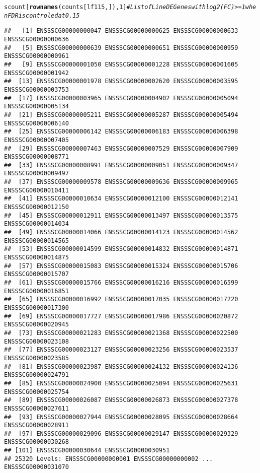 \documentclass{article}\usepackage[]{graphicx}\usepackage[]{color}
\makeatletter
\newcommand{\hlnum}[1]{\textcolor[rgb]{0.686,0.059,0.569}{#1}}%
\newcommand{\hlcom}[1]{\textcolor[rgb]{0.678,0.584,0.686}{\textit{#1}}}%
\newcommand{\hlstd}[1]{\textcolor[rgb]{0.345,0.345,0.345}{#1}}%
\newcommand{\hlkwd}[1]{\textcolor[rgb]{0.737,0.353,0.396}{\textbf{#1}}}%
\newenvironment{kframe}{%
 \def\at@end@of@kframe{}%
 \ifinner\ifhmode%
  \def\at@end@of@kframe{\end{minipage}}%
  \begin{minipage}{\columnwidth}%
 \fi\fi%
 \def\FrameCommand##1{\hskip\@totalleftmargin \hskip-\fboxsep
 \colorbox{shadecolor}{##1}\hskip-\fboxsep
     \hskip-\linewidth \hskip-\@totalleftmargin \hskip\columnwidth}%
 \MakeFramed {\advance\hsize-\width
   \@totalleftmargin\z@ \linewidth\hsize
   \@setminipage}}%
 {\par\unskip\endMakeFramed%
 \at@end@of@kframe}
\newenvironment{knitrout}{}{} %
\makeatother
\begin{document}
\begin{knitrout}
\begin{kframe}
\begin{alltt}
\hlstd{scount[}\hlkwd{rownames}\hlstd{(counts[lf115, ]),} \hlnum{1}\hlstd{]}  \hlcom{# List of  Line DE Genes with log2(FC) >=1 when FDR is controled at 0.15}
\end{alltt}
\begin{verbatim}
##   [1] ENSSSCG00000000047 ENSSSCG00000000625 ENSSSCG00000000633 ENSSSCG00000000636
##   [5] ENSSSCG00000000639 ENSSSCG00000000651 ENSSSCG00000000959 ENSSSCG00000000961
##   [9] ENSSSCG00000001050 ENSSSCG00000001228 ENSSSCG00000001605 ENSSSCG00000001942
##  [13] ENSSSCG00000001978 ENSSSCG00000002620 ENSSSCG00000003595 ENSSSCG00000003753
##  [17] ENSSSCG00000003965 ENSSSCG00000004902 ENSSSCG00000005094 ENSSSCG00000005134
##  [21] ENSSSCG00000005211 ENSSSCG00000005287 ENSSSCG00000005494 ENSSSCG00000006140
##  [25] ENSSSCG00000006142 ENSSSCG00000006183 ENSSSCG00000006398 ENSSSCG00000007405
##  [29] ENSSSCG00000007463 ENSSSCG00000007529 ENSSSCG00000007909 ENSSSCG00000008771
##  [33] ENSSSCG00000008991 ENSSSCG00000009051 ENSSSCG00000009347 ENSSSCG00000009497
##  [37] ENSSSCG00000009578 ENSSSCG00000009636 ENSSSCG00000009965 ENSSSCG00000010411
##  [41] ENSSSCG00000010634 ENSSSCG00000012100 ENSSSCG00000012141 ENSSSCG00000012150
##  [45] ENSSSCG00000012911 ENSSSCG00000013497 ENSSSCG00000013575 ENSSSCG00000014034
##  [49] ENSSSCG00000014066 ENSSSCG00000014123 ENSSSCG00000014562 ENSSSCG00000014565
##  [53] ENSSSCG00000014599 ENSSSCG00000014832 ENSSSCG00000014871 ENSSSCG00000014875
##  [57] ENSSSCG00000015083 ENSSSCG00000015324 ENSSSCG00000015706 ENSSSCG00000015707
##  [61] ENSSSCG00000015766 ENSSSCG00000016216 ENSSSCG00000016599 ENSSSCG00000016851
##  [65] ENSSSCG00000016992 ENSSSCG00000017035 ENSSSCG00000017220 ENSSSCG00000017300
##  [69] ENSSSCG00000017727 ENSSSCG00000017986 ENSSSCG00000020872 ENSSSCG00000020945
##  [73] ENSSSCG00000021283 ENSSSCG00000021368 ENSSSCG00000022500 ENSSSCG00000023108
##  [77] ENSSSCG00000023127 ENSSSCG00000023256 ENSSSCG00000023537 ENSSSCG00000023585
##  [81] ENSSSCG00000023987 ENSSSCG00000024132 ENSSSCG00000024136 ENSSSCG00000024791
##  [85] ENSSSCG00000024900 ENSSSCG00000025094 ENSSSCG00000025631 ENSSSCG00000025754
##  [89] ENSSSCG00000026087 ENSSSCG00000026873 ENSSSCG00000027378 ENSSSCG00000027611
##  [93] ENSSSCG00000027944 ENSSSCG00000028095 ENSSSCG00000028664 ENSSSCG00000028911
##  [97] ENSSSCG00000029096 ENSSSCG00000029147 ENSSSCG00000029329 ENSSSCG00000030268
## [101] ENSSSCG00000030644 ENSSSCG00000030951
## 25320 Levels: ENSSSCG00000000001 ENSSSCG00000000002 ... ENSSSCG00000031070
\end{verbatim}
\begin{alltt}

\end{alltt}
\end{kframe}
\end{knitrout}
\end{document}
